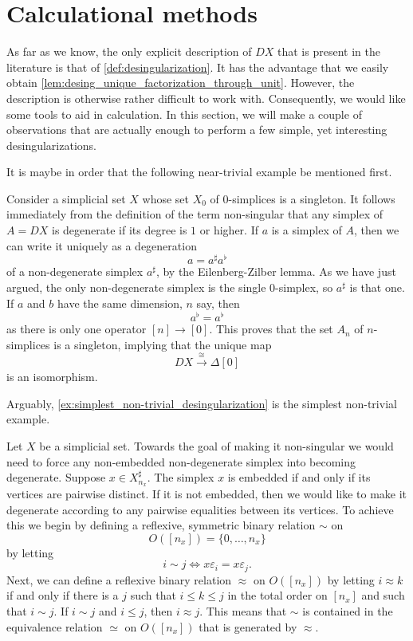 

\section{Calculational methods}
\label{sec:calculations}

As far as we know, the only explicit description of $DX$ that is present in the literature is that of \cref{def:desingularization}. It has the advantage that we easily obtain \cref{lem:desing_unique_factorization_through_unit}. However, the description is otherwise rather difficult to work with. Consequently, we would like some tools to aid in calculation. In this section, we will make a couple of observations that are actually enough to perform a few simple, yet interesting desingularizations.

It is maybe in order that the following near-trivial example be mentioned first.
\begin{example}\label{ex:simplest_non-trivial_desingularization}
Consider a simplicial set $X$ whose set $X_0$ of $0$-simplices is a singleton. It follows immediately from the definition of the term non-singular that any simplex of $A=DX$ is degenerate if its degree is $1$ or higher. If $a$ is a simplex of $A$, then we can write it uniquely as a degeneration
\[a=a^\sharp a^\flat\]
of a non-degenerate simplex $a^\sharp$, by the Eilenberg-Zilber lemma. As we have just argued, the only non-degenerate simplex is the single $0$-simplex, so $a^\sharp$ is that one. If $a$ and $b$ have the same dimension, $n$ say, then
\[a^\flat =a^\flat\]
as there is only one operator $[n]\to [0]$. This proves that the set $A_n$ of $n$-simplices is a singleton, implying that the unique map
\[DX\xrightarrow{\cong } \Delta [0]\]
is an isomorphism.
\end{example}
\noindent Arguably, \cref{ex:simplest_non-trivial_desingularization} is the simplest non-trivial example.

Let $X$ be a simplicial set. Towards the goal of making it non-singular we would need to force any non-embedded non-degenerate simplex into becoming degenerate. Suppose $x\in X^\sharp _{n_x}$. The simplex $x$ is embedded if and only if its vertices are pairwise distinct. If it is not embedded, then we would like to make it degenerate according to any pairwise equalities between its vertices. To achieve this we begin by defining a reflexive, symmetric binary relation $\sim$ on
\[O([n_x])=\{ 0,\dots ,n_x\}\]
by letting
\[i\sim j\Leftrightarrow x\varepsilon _i=x\varepsilon _j.\]
Next, we can define a reflexive binary relation $\approx$ on $O([n_x])$ by letting $i\approx k$ if and only if there is a $j$ such that $i\leq k\leq j$ in the total order on $[n_x]$ and such that $i\sim j$. If $i\sim j$ and $i\leq j$, then $i\approx j$. This means that $\sim$ is contained in the equivalence relation $\simeq$ on $O([n_x])$ that is generated by $\approx$.

